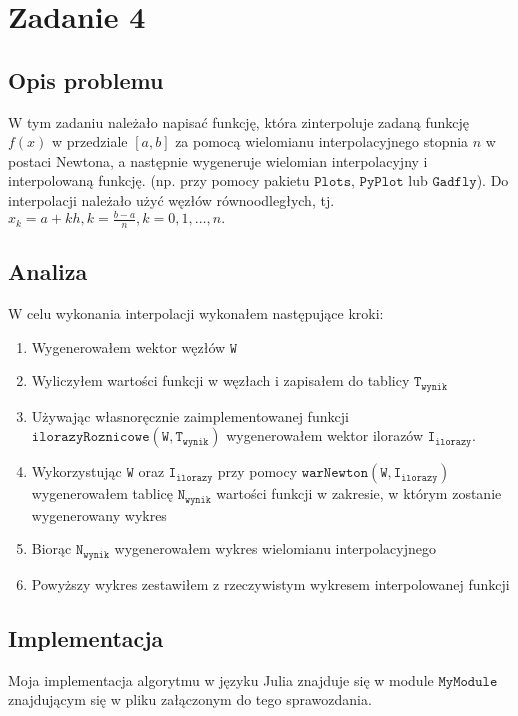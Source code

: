 \section{Zadanie 4}
\subsection{Opis problemu}
W tym zadaniu należało napisać funkcję, która zinterpoluje zadaną funkcję $f(x)$ w przedziale $[a, b]$ za pomocą wielomianu interpolacyjnego stopnia $n$ w postaci Newtona, a następnie wygeneruje wielomian interpolacyjny i interpolowaną funkcję. (np. przy pomocy pakietu $\mathtt{Plots}$, $\mathtt{PyPlot}$ lub $\mathtt{Gadfly}$). Do interpolacji należało użyć węzłów równoodległych, tj. $x_k = a + kh, k = \frac{b - a}{n}, k = 0, 1, \ldots,  n.$
\subsection{Analiza}
W celu wykonania interpolacji wykonałem następujące kroki:
\begin{enumerate}
  \item Wygenerowałem wektor węzłów $\mathtt{W}$
  \item Wyliczyłem wartości funkcji w węzłach i zapisałem do tablicy $\mathtt{T_{wynik}}$
  \item Używając własnoręcznie zaimplementowanej funkcji $\mathtt{ilorazyRoznicowe(W, T_{wynik})}$ wygenerowałem wektor ilorazów $\mathtt{I_{ilorazy}}$.
  \item Wykorzystując  $\mathtt{W}$ oraz $\mathtt{I_{ilorazy}}$ przy pomocy $\mathtt{warNewton(W, I_{ilorazy})}$ wygenerowałem tablicę $\mathtt{N_{wynik}}$ wartości funkcji w zakresie, w którym zostanie wygenerowany wykres
  \item Biorąc $\mathtt{N_{wynik}}$ wygenerowałem wykres wielomianu interpolacyjnego
  \item Powyższy wykres zestawiłem z rzeczywistym wykresem interpolowanej funkcji
\end{enumerate}
\subsection{Implementacja}
Moja implementacja algorytmu w języku Julia znajduje się w module $ \texttt{MyModule} $ znajdującym się w pliku załączonym do tego sprawozdania.